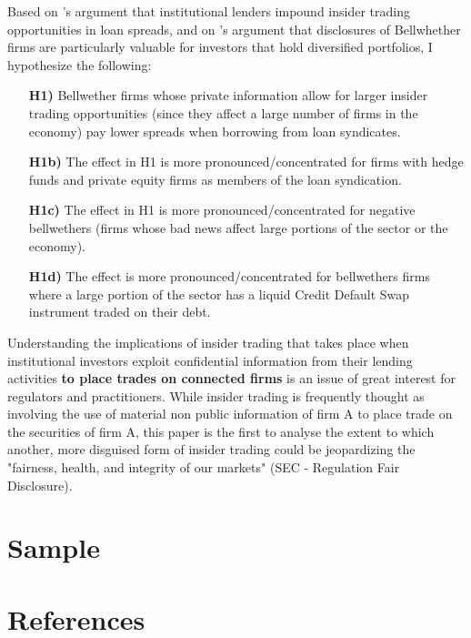 \documentclass[english, 1p]{elsarticle}
\begin{document}
Based on \citep{Bushman2014}'s argument that institutional lenders impound insider trading opportunities in loan spreads, and on \cite{Tseng2014w}'s argument that disclosures of Bellwhether firms are particularly valuable for investors that hold diversified portfolios, I hypothesize the following:
\begin{itemize}
	\item[\textbf{H1)}] Bellwether firms whose private information allow for larger insider trading opportunities (since they affect a large number of firms in the economy) pay lower spreads when borrowing from loan syndicates.
	\item[\textbf{H1b)}] The effect in H1 is more pronounced/concentrated for firms with hedge funds and private equity firms as members of the loan syndication. 
	
	\item[\textbf{H1c)}] The effect in H1 is more pronounced/concentrated for negative bellwethers (firms whose bad news affect large portions of the sector or the economy). 
	
	\item[\textbf{H1d)}] The effect is more pronounced/concentrated for bellwethers firms where a large portion of the sector has a liquid Credit Default Swap instrument traded on their debt. 
\end{itemize}

Understanding the implications of insider trading that takes place when institutional investors exploit confidential information from their lending activities \textbf{to place trades on connected firms} is an issue of great interest for regulators and practitioners. While insider trading is frequently thought as involving the use of material non public information of firm A to place trade on the securities of firm A, this paper is the first to analyse the extent to which another, more disguised form of insider trading could be jeopardizing the "fairness, health, and integrity of our markets" (SEC - Regulation Fair Disclosure).   


\section{Sample}


\pagebreak
\section*{References}


\pagebreak
\end{document}
